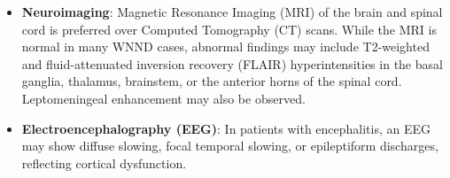 \begin{itemize}
    \begin{itemize}
        \item Moderate pleocytosis (usually ranging from 10 to 500 white blood cells per microlitre), with a predominance of lymphocytes, though neutrophils may predominate in the early hours of infection.
        \item Elevated protein concentration, typically between 50 and 150 mg/dL.
        \item Normal glucose concentration (distinguishing it from bacterial or fungal meningitis).
    \end{itemize}
    \item \textbf{Neuroimaging}: Magnetic Resonance Imaging (MRI) of the brain and spinal cord is preferred over Computed Tomography (CT) scans. While the MRI is normal in many WNND cases, abnormal findings may include T2-weighted and fluid-attenuated inversion recovery (FLAIR) hyperintensities in the basal ganglia, thalamus, brainstem, or the anterior horns of the spinal cord. Leptomeningeal enhancement may also be observed.
    \item \textbf{Electroencephalography (EEG)}: In patients with encephalitis, an EEG may show diffuse slowing, focal temporal slowing, or epileptiform discharges, reflecting cortical dysfunction.
\end{itemize}

